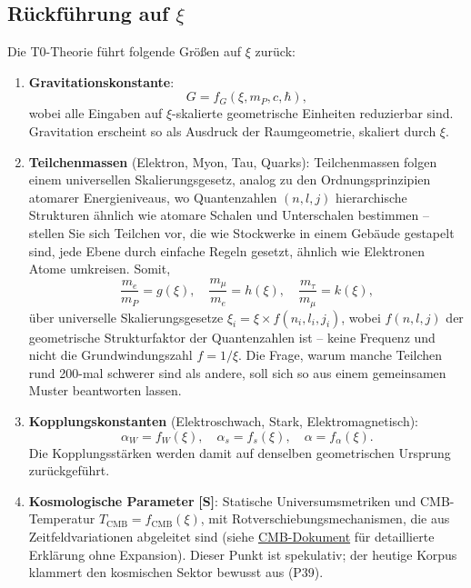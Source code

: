 	\subsection{Rückführung auf $\xi$}
	Die T0-Theorie führt folgende Größen auf $\xi$ zurück:
	\begin{enumerate}
		\item \textbf{Gravitationskonstante}:
		\[
		G = f_G(\xi, m_P, c, \hbar),
		\]
		wobei alle Eingaben auf $\xi$-skalierte geometrische Einheiten reduzierbar sind. Gravitation erscheint so als Ausdruck der Raumgeometrie, skaliert durch $\xi$.
		
		\item \textbf{Teilchenmassen} (Elektron, Myon, Tau, Quarks):
		Teilchenmassen folgen einem universellen Skalierungsgesetz, analog zu den Ordnungsprinzipien atomarer Energieniveaus, wo Quantenzahlen $(n, l, j)$ hierarchische Strukturen ähnlich wie atomare Schalen und Unterschalen bestimmen – stellen Sie sich Teilchen vor, die wie Stockwerke in einem Gebäude gestapelt sind, jede Ebene durch einfache Regeln gesetzt, ähnlich wie Elektronen Atome umkreisen. Somit,
		\[
		\frac{m_e}{m_P} = g(\xi), \quad \frac{m_\mu}{m_e} = h(\xi), \quad \frac{m_\tau}{m_\mu} = k(\xi),
		\]
		über universelle Skalierungsgesetze $\xi_i = \xi \times f(n_i, l_i, j_i)$, wobei $f(n,l,j)$ der geometrische Strukturfaktor der Quantenzahlen ist -- keine Frequenz und nicht die Grundwindungszahl $f = 1/\xi$. Die Frage, warum manche Teilchen rund 200-mal schwerer sind als andere, soll sich so aus einem gemeinsamen Muster beantworten lassen.
		
		\item \textbf{Kopplungskonstanten} (Elektroschwach, Stark, Elektromagnetisch):
		\[
		\alpha_W = f_W(\xi), \quad \alpha_s = f_s(\xi), \quad \alpha = f_\alpha(\xi).
		\]
		Die Kopplungsstärken werden damit auf denselben geometrischen Ursprung zurückgeführt.
		
		\item \textbf{Kosmologische Parameter} \textbf{[S]}:
		Statische Universumsmetriken und CMB-Temperatur $T_{\text{CMB}} = f_{\text{CMB}}(\xi)$, mit Rotverschiebungsmechanismen, die aus Zeitfeldvariationen abgeleitet sind (siehe \href{https://github.com/jpascher/T0-Time-Mass-Duality/blob/main/2/pdf/140_T0_CMB_Donoghue_Analyse_En.pdf}{CMB-Dokument} für detaillierte Erklärung ohne Expansion). Dieser Punkt ist spekulativ; der heutige Korpus klammert den kosmischen Sektor bewusst aus (P39).
	\end{enumerate}

